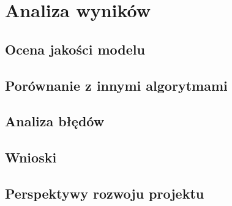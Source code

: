 \chapter{Analiza wyników}

\section{Ocena jakości modelu}

\section{Porównanie z innymi algorytmami}

\section{Analiza błędów}

\section{Wnioski}

\section{Perspektywy rozwoju projektu}